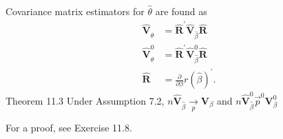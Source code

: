 \documentclass[10pt]{article}
\begin{document}
Covariance matrix estimators for $\widehat{\theta}$ are found as
$$
\begin{aligned}
\widehat{\boldsymbol{V}}_{\widehat{\theta}} &=\widehat{\boldsymbol{R}}^{\prime} \widehat{\boldsymbol{V}}_{\widehat{\beta}} \widehat{\boldsymbol{R}} \\
\widehat{\boldsymbol{V}}_{\widehat{\theta}}^{0} &=\widehat{\boldsymbol{R}}^{\prime} \widehat{\boldsymbol{V}}_{\widehat{\beta}}^{0} \widehat{\boldsymbol{R}} \\
\widehat{\boldsymbol{R}} &=\frac{\partial}{\partial \beta} r(\widehat{\beta})^{\prime} .
\end{aligned}
$$
Theorem 11.3 Under Assumption 7.2, $n \widehat{\boldsymbol{V}}_{\widehat{\beta}} \underset{p}{\rightarrow} \boldsymbol{V}_{\beta}$ and $n \widehat{\boldsymbol{V}}_{\widehat{\beta}}^{0} \vec{p}^{0} \boldsymbol{V}_{\beta}^{0}$

For a proof, see Exercise 11.8.
\end{document}
